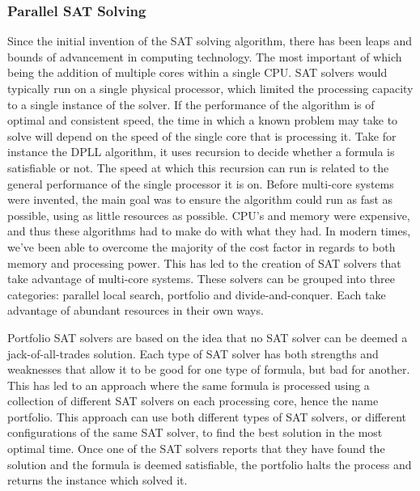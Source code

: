 \documentclass{article}
\begin{document}
    \subsubsection{Parallel SAT Solving}
    Since the initial invention of the SAT solving algorithm, there has been leaps and bounds of advancement in computing technology. The
    most important of which being the addition of multiple cores within a single CPU. SAT solvers would typically run on a single physical
    processor, which limited the processing capacity to a single instance of the solver. If the performance of the algorithm is of optimal
    and consistent speed, the time in which a known problem may take to solve will depend on the speed of the single core that is processing
    it. Take for instance the DPLL algorithm, it uses recursion to decide whether a formula is satisfiable or not. The speed at which this
    recursion can run is related to the general performance of the single processor it is on. Before multi-core systems were invented,
    the main goal was to ensure the algorithm could run as fast as possible, using as little resources as possible. CPU's and memory were
    expensive, and thus these algorithms had to make do with what they had. In modern times, we've been able to overcome the majority of the
    cost factor in regards to both memory and processing power. This has led to the creation of SAT solvers that take advantage of
    multi-core systems. These solvers can be grouped into three categories: parallel local search, portfolio and divide-and-conquer. Each
    take advantage of abundant resources in their own ways.

    Portfolio SAT solvers are based on the idea that no SAT solver can be deemed a jack-of-all-trades solution. Each type of SAT solver has
    both strengths and weaknesses that allow it to be good for one type of formula, but bad for another. This has led to an approach where
    the same formula is processed using a collection of different SAT solvers on each processing core, hence the name portfolio. This
    approach can use both different types of SAT solvers, or different configurations of the same SAT solver, to find the best solution in
    the most optimal time. Once one of the SAT solvers reports that they have found the solution and the formula is deemed satisfiable, the
    portfolio halts the process and returns the instance which solved it\cite{parallel}.
\end{document}
